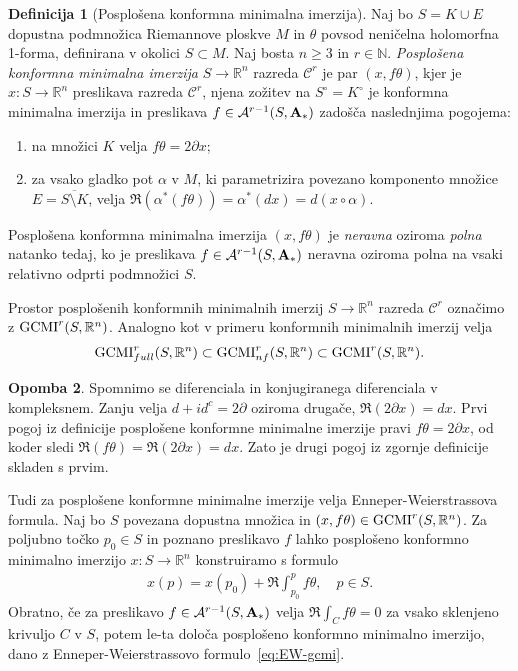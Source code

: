 \documentclass[12pt,a4paper,twoside]{article}
\theoremstyle{definition} %
\newtheorem{definicija}{Definicija}[section]
\newtheorem{opomba}[definicija]{Opomba}
\theoremstyle{plain} %
\numberwithin{equation}{section}  %
\newcommand{\R}{\mathbb R}
\newcommand{\N}{\mathbb N}
\begin{document}
\begin{definicija} [Posplošena konformna minimalna imerzija]
Naj bo $S = K \cup E$ dopustna podmnožica Riemannove ploskve $M$ in $\theta$ povsod neničelna holomorfna 1-forma, definirana v okolici $S \subset M$.
Naj bosta $n \geq 3$ in $r \in \N$. \emph{Posplošena konformna minimalna imerzija} $S \to \R^{n}$ razreda $\mathcal{C}^{r}$ je par $(x, f \theta)$, kjer je $x \colon S \to \R^{n}$ preslikava razreda  $\mathcal{C}^{r}$, njena zožitev na $S^\circ = K^\circ$ je konformna minimalna imerzija in preslikava $f \in \mathcal{A}^{r-1}(S, \textbf{\textup{A}}_{*})$ zadošča naslednjima pogojema:
\begin{enumerate}
\item na množici $K$ velja $f \theta = 2 \partial x$;
\item za vsako gladko pot $\alpha$ v $M$, ki parametrizira povezano komponento množice $E = \overline{S \setminus K}$, velja $ \Re(\alpha^{*}(f \theta)) = \alpha^{*}(dx) = d(x \circ \alpha)$.
\end{enumerate}
%
Posplošena konformna minimalna imerzija $(x, f \theta)$ je \emph{neravna} oziroma \emph{polna} natanko tedaj, ko je preslikava $f \in \mathcal{A}^{r-1}(S, \textbf{\textup{A}}_{*})$ neravna oziroma polna na vsaki relativno odprti podmnožici $S$.
\end{definicija}

Prostor posplošenih konformnih minimalnih imerzij $S \to \R^{n}$ razreda $\mathcal{C}^{r}$ označimo z $\textup{GCMI}^{r}(S, \R^{n})$. Analogno kot v primeru konformnih minimalnih imerzij velja 
\begin{gather*}
\textup{GCMI}_{full}^{r}(S, \R^{n}) \subset \textup{GCMI}_{nf}^{r}(S, \R^{n}) \subset \textup{GCMI}^{r}(S, \R^{n}).
\end{gather*}

\begin{opomba}
Spomnimo se diferenciala in konjugiranega diferenciala v kompleksnem. Zanju velja $d + i d^{c} = 2 \partial$ oziroma drugače, $\Re(2 \partial x) = dx$.
Prvi pogoj iz definicije posplošene konformne minimalne imerzije pravi $f \theta = 2 \partial x$, od koder sledi $\Re(f \theta) = \Re(2 \partial x) = dx$. Zato je drugi pogoj iz zgornje definicije skladen s prvim.
\end{opomba}

Tudi za posplošene konformne minimalne imerzije velja Enneper-Weierstrassova formula.
Naj bo $S$ povezana dopustna množica in $(x, f \theta) \in \textup{GCMI}^{r}(S, \R^{n})$. Za poljubno točko $p_{0} \in S$ in poznano preslikavo $f$ lahko posplošeno konformno minimalno imerzijo $x \colon S \to \R^{n}$ konstruiramo s formulo
\begin{align} \label{eq:EW-gcmi}
x(p) = x(p_{0}) + \Re \int_{p_0}^{p} f \theta, \quad p \in S.
\end{align} 
Obratno, če za preslikavo $f \in \mathcal{A}^{r-1}(S, \textbf{\textup{A}}_{*})$ velja $ \Re \int_{C} f \theta = 0$ za vsako sklenjeno krivuljo $C$ v $S$, potem le-ta določa posplošeno konformno minimalno imerzijo, dano z Enneper-Weierstrassovo formulo~\eqref{eq:EW-gcmi}.
\end{document}
